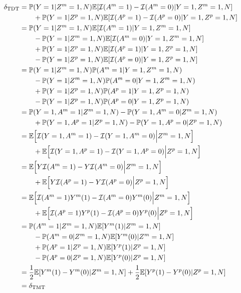 \documentclass[12pt]{extarticle}
\newcommand{\pp}{\mathbb{P}}
\newcommand{\E}{\mathbb{E}}
\newcommand{\indicator}{\mathcal{I}}
\newcommand{\tmt}{{\normalfont \text{TMT}}}
\newcommand{\tdt}{{\normalfont \text{TDT}}}
\begin{document}
{{{\allowdisplaybreaks \begin{align*}
\delta_{\tdt} &= \pp(Y=1|Z^m=1,N) \E[\indicator(A^m=1)-\indicator(A^m=0)|Y=1,Z^m=1,N] ~ \\
& \qquad + \pp(Y=1|Z^p=1,N) \E[\indicator(A^p=1)-\indicator(A^p=0)|Y=1,Z^p=1,N] \\
& = \pp(Y=1|Z^m=1,N)\E[\indicator(A^m=1)|Y=1,Z^m=1,N] ~ \\
& \qquad - \pp(Y=1|Z^m=1,N)\E[\indicator(A^m=0)|Y=1,Z^m=1,N] ~ \\
& \qquad + \pp(Y=1|Z^p=1,N) \E[\indicator(A^p=1)|Y=1,Z^p=1,N] ~ \\
& \qquad - \pp(Y=1|Z^p=1,N) \E[\indicator(A^p=0)|Y=1,Z^p=1,N] \\
& = \pp(Y=1|Z^m=1,N) \pp(A^m=1|Y=1,Z^m=1,N) ~ \\
& \qquad - \pp(Y=1|Z^m=1,N) \pp(A^m=0|Y=1,Z^m=1,N) ~ \\
& \qquad + \pp(Y=1|Z^p=1,N) \pp(A^p=1|Y=1,Z^p=1,N) ~ \\
& \qquad - \pp(Y=1|Z^p=1,N) \pp(A^p=0|Y=1,Z^p=1,N) \\
& = \pp(Y=1,A^m=1|Z^m=1,N) - \pp(Y=1,A^m=0|Z^m=1,N) ~ \\
& \qquad + \pp(Y=1,A^p=1|Z^p=1,N) - \pp(Y=1,A^p=0|Z^p=1,N) ~ \\
& = \E\Big[\indicator(Y=1,A^m=1)-\indicator(Y=1,A^m=0)\Big|Z^m=1,N\Big] ~ \\
& \qquad + \E\Big[\indicator(Y=1,A^p=1)-\indicator(Y=1,A^p=0)\Big|Z^p=1,N\Big] \\
& = \E\Big[Y\indicator(A^m=1) - Y\indicator(A^m=0)\Big|Z^m=1,N\Big] ~ \\
& \qquad + \E\Big[Y\indicator(A^p=1) - Y\indicator(A^p=0)\Big|Z^p=1,N\Big] \\
& = \E\Big[\indicator(A^m=1)Y^m(1) - \indicator(A^m=0)Y^m(0)\Big|Z^m=1,N\Big] ~ \\
& \qquad + \E\Big[\indicator(A^p=1)Y^p(1) - \indicator(A^p=0)Y^p(0)\Big|Z^p=1,N\Big] \\
& = \pp(A^m=1|Z^m=1,N)\E[Y^m(1)|Z^m=1,N] ~ \\
& \qquad - \pp(A^m=0|Z^m=1,N)\E[Y^m(0)|Z^m=1,N] ~ \\
& \qquad + \pp(A^p=1|Z^p=1,N)\E[Y^p(1)|Z^p=1,N] ~ \\
& \qquad - \pp(A^p=0|Z^p=1,N)\E[Y^p(0)|Z^p=1,N] \\
& = \frac{1}{2} \E[Y^m(1)-Y^m(0)|Z^m=1,N] + \frac{1}{2}\E[Y^p(1)-Y^p(0)|Z^p=1,N] \\
& = \delta_{\tmt}
\end{align*}} 

}}
\end{document}
